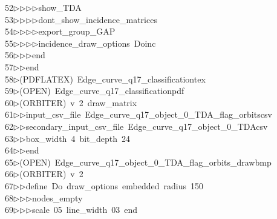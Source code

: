 \begin{tabbing}
52\>$\triangleright$\>$\triangleright$\>$\triangleright$\>$\triangleright$\>show\_TDA\ \\[0pt]
53\>$\triangleright$\>$\triangleright$\>$\triangleright$\>$\triangleright$\>dont\_show\_incidence\_matrices\ \\[0pt]
54\>$\triangleright$\>$\triangleright$\>$\triangleright$\>$\triangleright$\>export\_group\_GAP\ \\[0pt]
55\>$\triangleright$\>$\triangleright$\>$\triangleright$\>$\triangleright$\>incidence\_draw\_options\ Doinc\ \\[0pt]
56\>$\triangleright$\>$\triangleright$\>$\triangleright$\>end\ \\[0pt]
57\>$\triangleright$\>$\triangleright$\>end\\[0pt]
58\>$\triangleright$\>(PDFLATEX)\ Edge\_curve\_q17\_classificationtex\\[0pt]
59\>$\triangleright$\>(OPEN)\ Edge\_curve\_q17\_classificationpdf\\[0pt]
60\>$\triangleright$\>(ORBITER)\ v\ 2\ draw\_matrix\ \\[0pt]
61\>$\triangleright$\>$\triangleright$\>input\_csv\_file\ Edge\_curve\_q17\_object\_0\_TDA\_flag\_orbitscsv\ \\[0pt]
62\>$\triangleright$\>$\triangleright$\>secondary\_input\_csv\_file\ Edge\_curve\_q17\_object\_0\_TDAcsv\ \\[0pt]
63\>$\triangleright$\>$\triangleright$\>box\_width\ 4\ bit\_depth\ 24\ \\[0pt]
64\>$\triangleright$\>$\triangleright$\>end\\[0pt]
65\>$\triangleright$\>(OPEN)\ Edge\_curve\_q17\_object\_0\_TDA\_flag\_orbits\_drawbmp\\[0pt]
66\>$\triangleright$\>(ORBITER)\ v\ 2\ \\[0pt]
67\>$\triangleright$\>$\triangleright$\>define\ Do\ draw\_options\ embedded\ radius\ 150\ \\[0pt]
68\>$\triangleright$\>$\triangleright$\>$\triangleright$\>nodes\_empty\ \\[0pt]
69\>$\triangleright$\>$\triangleright$\>$\triangleright$\>scale\ 05\ line\_width\ 03\ end\ \\[0pt]

\end{tabbing}
